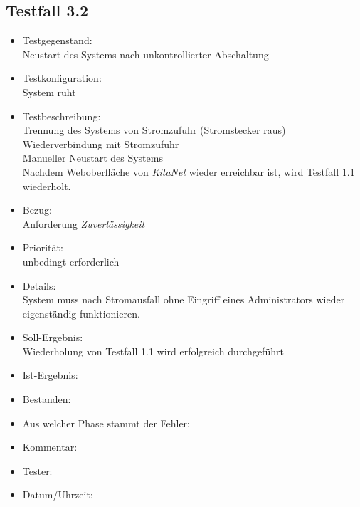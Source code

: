 \subsection{Testfall 3.2}
\begin{itemize}
	\item Testgegenstand:\\
Neustart des Systems nach unkontrollierter Abschaltung
	\item Testkonfiguration:\\
	System ruht
	\item Testbeschreibung:\\
	Trennung des Systems von Stromzufuhr (Stromstecker raus)\\
	Wiederverbindung mit Stromzufuhr\\
	Manueller Neustart des Systems\\
	Nachdem Weboberfläche von \textit{KitaNet} wieder erreichbar ist, wird Testfall 1.1 wiederholt.
	\item Bezug:\\
	Anforderung \textit{Zuverlässigkeit}
	\item Priorität:\\
	unbedingt erforderlich
	\item Details:\\
	System muss nach Stromausfall ohne Eingriff eines Administrators wieder eigenständig  funktionieren.
	\item Soll-Ergebnis:\\
	Wiederholung von Testfall 1.1 wird erfolgreich durchgeführt
	\item Ist-Ergebnis:\\
	\item Bestanden:\\
	\item Aus welcher Phase stammt der Fehler:\\
	\item Kommentar:\\
	\item Tester:\\
	\item Datum/Uhrzeit:\\
\end{itemize}


